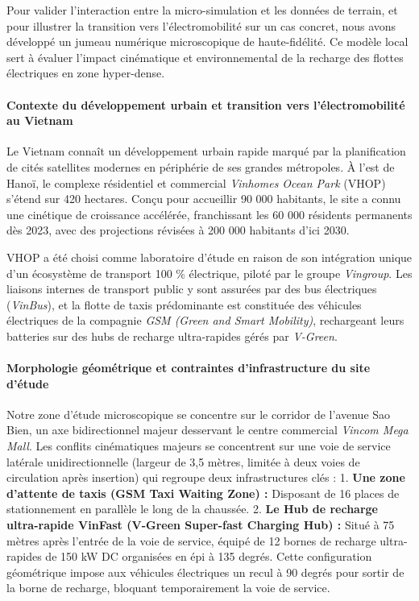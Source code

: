 \documentclass[10pt, a4paper]{article}
\begin{document}
Pour valider l'interaction entre la micro-simulation et les données de
terrain, et pour illustrer la transition vers l'électromobilité sur un
cas concret, nous avons développé un jumeau numérique microscopique de
haute-fidélité. Ce modèle local sert à évaluer l'impact cinématique et
environnemental de la recharge des flottes électriques en zone
hyper-dense.

\paragraph{Contexte du développement urbain et transition vers
l'électromobilité au
Vietnam}\label{contexte-du-duxe9veloppement-urbain-et-transition-vers-luxe9lectromobilituxe9-au-vietnam}

Le Vietnam connaît un développement urbain rapide marqué par la
planification de cités satellites modernes en périphérie de ses grandes
métropoles. À l'est de Hanoï, le complexe résidentiel et commercial
\emph{Vinhomes Ocean Park} (VHOP) s'étend sur 420 hectares. Conçu pour
accueillir 90 000 habitants, le site a connu une cinétique de croissance
accélérée, franchissant les 60 000 résidents permanents dès 2023, avec
des projections révisées à 200 000 habitants d'ici 2030.

VHOP a été choisi comme laboratoire d'étude en raison de son intégration
unique d'un écosystème de transport 100 \% électrique, piloté par le
groupe \emph{Vingroup}. Les liaisons internes de transport public y sont
assurées par des bus électriques (\emph{VinBus}), et la flotte de taxis
prédominante est constituée des véhicules électriques de la compagnie
\emph{GSM (Green and Smart Mobility)}, rechargeant leurs batteries sur
des hubs de recharge ultra-rapides gérés par \emph{V-Green}.

\paragraph{Morphologie géométrique et contraintes d'infrastructure du
site
d'étude}\label{morphologie-guxe9omuxe9trique-et-contraintes-dinfrastructure-du-site-duxe9tude}

Notre zone d'étude microscopique se concentre sur le corridor de
l'avenue Sao Bien, un axe bidirectionnel majeur desservant le centre
commercial \emph{Vincom Mega Mall}. Les conflits cinématiques majeurs se
concentrent sur une voie de service latérale unidirectionnelle (largeur
de 3,5 mètres, limitée à deux voies de circulation après insertion) qui
regroupe deux infrastructures clés : 1. \textbf{Une zone d'attente de
taxis (GSM Taxi Waiting Zone) :} Disposant de 16 places de stationnement
en parallèle le long de la chaussée. 2. \textbf{Le Hub de recharge
ultra-rapide VinFast (V-Green Super-fast Charging Hub) :} Situé à 75
mètres après l'entrée de la voie de service, équipé de 12 bornes de
recharge ultra-rapides de 150 kW DC organisées en épi à 135 degrés.
Cette configuration géométrique impose aux véhicules électriques un
recul à 90 degrés pour sortir de la borne de recharge, bloquant
temporairement la voie de service.
\end{document}
